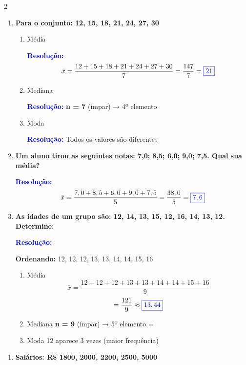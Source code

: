 \documentclass[11pt]{article}
\newcommand{\respostaNum}[1]{\textcolor{blue}{\boxed{#1}}}
\newcommand{\resolucao}{\textbf{\textcolor{blue}{Resolução:}}}
\begin{document}
\begin{multicols}{2}
\begin{enumerate}[leftmargin=*]
\item \textbf{Para o conjunto: 12, 15, 18, 21, 24, 27, 30}

\begin{enumerate}[label=\alph*)]
\item Média

\resolucao
\[
\bar{x} = \frac{12+15+18+21+24+27+30}{7} = \frac{147}{7} = \respostaNum{21}
\]

\item Mediana

\resolucao
\textbf{n = 7} (ímpar) → 4º elemento \\
\respostaNum{21}

\item Moda

\resolucao
Todos os valores são diferentes \\
\respostaNum{\text{amodal}}
\end{enumerate}

\item \textbf{Um aluno tirou as seguintes notas: 7,0; 8,5; 6,0; 9,0; 7,5. Qual sua média?}

\resolucao
\[
\bar{x} = \frac{7,0+8,5+6,0+9,0+7,5}{5} = \frac{38,0}{5} = \respostaNum{7,6}
\]

\item \textbf{As idades de um grupo são: 12, 14, 13, 15, 12, 16, 14, 13, 12. Determine:}

\resolucao

\textbf{Ordenando:} 12, 12, 12, 13, 13, 14, 14, 15, 16

\begin{enumerate}[label=\alph*)]
\item Média
\[
    \bar{x} = \frac{12+12+12+13+13+14+14+15+16}{9} \] 
\[= \frac{121}{9} \approx \respostaNum{13,44} \]

\item Mediana
\textbf{n = 9} (ímpar) → 5º elemento = \respostaNum{13}

\item Moda
12 aparece 3 vezes (maior frequência) \\
\respostaNum{12}
\end{enumerate}

\end{enumerate}

\begin{enumerate}[leftmargin=*, start=7]

\item \textbf{Salários: R\$ 1800, 2000, 2200, 2500, 5000}


\end{enumerate}
\end{multicols}
\end{document}
